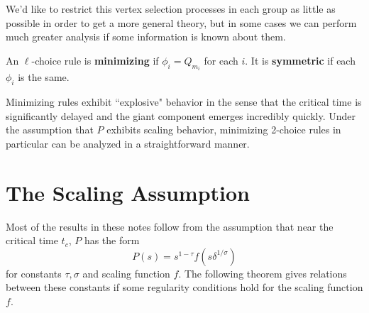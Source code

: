 \documentclass[twoside,10pt]{article}
\begin{document}
We'd like to restrict this vertex selection processes in each group as little as possible in order to get a more general theory, but in some cases we can perform much greater analysis if some information is known about them.

\begin{defn}[]
	An $\ell$-choice rule is \textbf{minimizing} if $\phi_i = Q_{m_i}$ for each $i$. It is \textbf{symmetric} if each $\phi_i$ is the same.
\end{defn}

Minimizing rules exhibit ``explosive" behavior in the sense that the critical time is significantly delayed and the giant component emerges incredibly quickly. Under the assumption that $P$ exhibits scaling behavior, minimizing 2-choice rules in particular can be analyzed in a straightforward manner.

\section{The Scaling Assumption}


Most of the results in these notes follow from the assumption that near the critical time $t_c$, $P$ has the form
\[
	P(s) = s^{1-\tau}f(s \delta^{1/\sigma})
\] for constants $\tau,\sigma$ and scaling function $f$.  The following theorem gives relations between these constants if some regularity conditions hold for the scaling function $f$.
\end{document}
